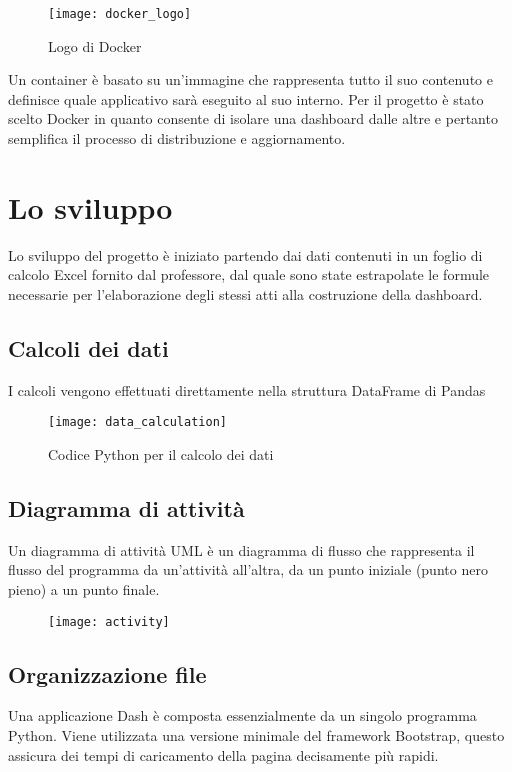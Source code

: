 \begin{figure}[htp]
    \centering
    \texttt{[image: docker\_logo]}
    \caption{Logo di Docker}
\end{figure}

\noindent Un container è basato su un’immagine che rappresenta tutto il suo contenuto e definisce quale applicativo sarà eseguito al suo interno. 
Per il progetto è stato scelto Docker in quanto consente di isolare una dashboard dalle altre e pertanto semplifica il processo di distribuzione e aggiornamento.

\section{Lo sviluppo}
Lo sviluppo del progetto è iniziato partendo dai dati contenuti in un foglio di calcolo Excel fornito dal professore, dal quale sono state estrapolate le formule necessarie per l’elaborazione degli stessi atti alla costruzione della dashboard.

\subsection{Calcoli dei dati}
I calcoli vengono effettuati direttamente nella struttura DataFrame di Pandas
\begin{figure}[htp]
    \centering
    \texttt{[image: data\_calculation]}
    \caption{Codice Python per il calcolo dei dati}
\end{figure}


\subsection{Diagramma di attività}
Un diagramma di attività UML è un diagramma di flusso che rappresenta il flusso del programma da un'attività all'altra,
da un punto iniziale (punto nero pieno) a un punto finale.

\begin{figure}[htp]
    \centering
    \texttt{[image: activity]}
\end{figure}

\subsection{Organizzazione file}
Una applicazione Dash è composta essenzialmente da un singolo programma Python.
Viene utilizzata una versione minimale del framework Bootstrap\footnotemark, questo assicura dei tempi di caricamento della pagina decisamente più rapidi.


